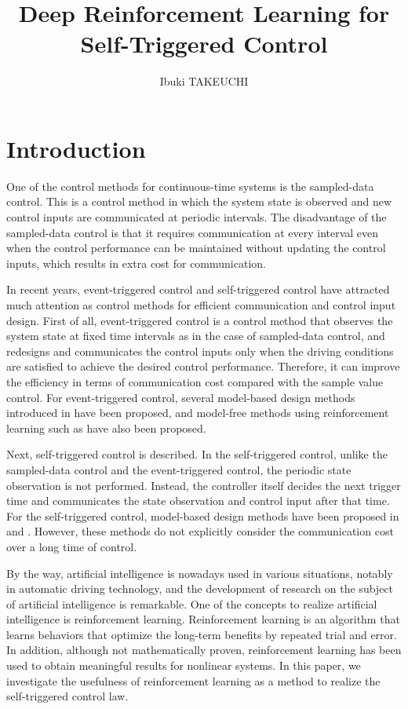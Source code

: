 \documentclass[english, dvipdfmx]{ampmt}             %
\title[Deep Reinforcement Learning for Self-Triggered Control]
      {Deep Reinforcement Learning for Self-Triggered Control}
\author{Ibuki TAKEUCHI}
\begin{document}
\ifoutputbody
\makeinsidecover                %
\makeabstract                   %
\maketoc                        %
\setcounter{page}{1}
\section{Introduction}
One of the control methods for continuous-time systems is the sampled-data control. This is a control method in which the system state is observed and new control inputs are communicated at periodic intervals. The disadvantage of the sampled-data control is that it requires communication at every interval even when the control performance can be maintained without updating the control inputs, which results in extra cost for communication.\par
In recent years, event-triggered control and self-triggered control have attracted much attention as control methods for efficient communication and control input design. First of all, event-triggered control is a control method that observes the system state at fixed time intervals as in the case of sampled-data control, and redesigns and communicates the control inputs only when the driving conditions are satisfied to achieve the desired control performance. Therefore, it can improve the efficiency in terms of communication cost compared with the sample value control. For event-triggered control, several model-based design methods introduced in \cite{ETC_intro} have been proposed, and model-free methods using reinforcement learning such as \cite{ETC} have also been proposed.\par
Next, self-triggered control is described. In the self-triggered control, unlike the sampled-data control and the event-triggered control, the periodic state observation is not performed. Instead, the controller itself decides the next trigger time and communicates the state observation and control input after that time. For the self-triggered control, model-based design methods have been proposed in \cite{STC} and \cite{ECBF}. However, these methods do not explicitly consider the communication cost over a long time of control.\par
By the way, artificial intelligence is nowadays used in various situations, notably in automatic driving technology, and the development of research on the subject of artificial intelligence is remarkable. One of the concepts to realize artificial intelligence is reinforcement learning. Reinforcement learning is an algorithm that learns behaviors that optimize the long-term benefits by repeated trial and error. In addition, although not mathematically proven, reinforcement learning has been used to obtain meaningful results for nonlinear systems. In this paper, we investigate the usefulness of reinforcement learning as a method to realize the self-triggered control law. \par
\end{document}
